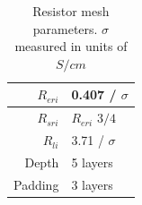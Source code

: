 \documentclass[journal, a4paper]{IEEEtran}
\begin{document}
\begin{table}
    \begin{center}
        \begin{tabular}{|r|l|}
            \hline
            $R_{eri}$ & 0.407 / $\sigma$ \\ \hline
            $R_{sri}$ & $R_{eri}$ $3/4$ \\ \hline
            $R_{li}$ & 3.71 / $\sigma$ \\ \hline
            Depth & 5 layers \\ \hline
            Padding & 3 layers \\ \hline
        \end{tabular}
    \end{center}
    \caption{Resistor mesh parameters. $\sigma$ measured in units of $S/cm$}
    \label{tab:RESparams}
\end{table}
\end{document}
